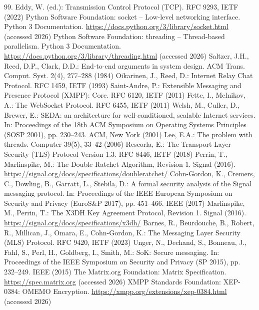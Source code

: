 \documentclass[graybox]{svmult}
\begin{document}
\begin{thebibliography}{99.}
 Eddy, W. (ed.): Transmission Control Protocol (TCP). RFC 9293, IETF (2022)
 Python Software Foundation: socket -- Low-level networking interface. Python 3 Documentation. \url{https://docs.python.org/3/library/socket.html} (accessed 2026)
 Python Software Foundation: threading -- Thread-based parallelism. Python 3 Documentation. \url{https://docs.python.org/3/library/threading.html} (accessed 2026)
 Saltzer, J.H., Reed, D.P., Clark, D.D.: End-to-end arguments in system design. ACM Trans. Comput. Syst. 2(4), 277--288 (1984)
 Oikarinen, J., Reed, D.: Internet Relay Chat Protocol. RFC 1459, IETF (1993)
 Saint-Andre, P.: Extensible Messaging and Presence Protocol (XMPP): Core. RFC 6120, IETF (2011)
 Fette, I., Melnikov, A.: The WebSocket Protocol. RFC 6455, IETF (2011)
 Welsh, M., Culler, D., Brewer, E.: SEDA: an architecture for well-conditioned, scalable Internet services. In: Proceedings of the 18th ACM Symposium on Operating Systems Principles (SOSP 2001), pp. 230--243. ACM, New York (2001)
 Lee, E.A.: The problem with threads. Computer 39(5), 33--42 (2006)
 Rescorla, E.: The Transport Layer Security (TLS) Protocol Version 1.3. RFC 8446, IETF (2018)
 Perrin, T., Marlinspike, M.: The Double Ratchet Algorithm, Revision 1. Signal (2016). \url{https://signal.org/docs/specifications/doubleratchet/}
 Cohn-Gordon, K., Cremers, C., Dowling, B., Garratt, L., Stebila, D.: A formal security analysis of the Signal messaging protocol. In: Proceedings of the IEEE European Symposium on Security and Privacy (EuroS\&P 2017), pp. 451--466. IEEE (2017)
 Marlinspike, M., Perrin, T.: The X3DH Key Agreement Protocol, Revision 1. Signal (2016). \url{https://signal.org/docs/specifications/x3dh/}
 Barnes, R., Beurdouche, B., Robert, R., Millican, J., Omara, E., Cohn-Gordon, K.: The Messaging Layer Security (MLS) Protocol. RFC 9420, IETF (2023)
 Unger, N., Dechand, S., Bonneau, J., Fahl, S., Perl, H., Goldberg, I., Smith, M.: SoK: Secure messaging. In: Proceedings of the IEEE Symposium on Security and Privacy (SP 2015), pp. 232--249. IEEE (2015)
 The Matrix.org Foundation: Matrix Specification. \url{https://spec.matrix.org} (accessed 2026)
 XMPP Standards Foundation: XEP-0384: OMEMO Encryption. \url{https://xmpp.org/extensions/xep-0384.html} (accessed 2026)

\end{thebibliography}
\end{document}
